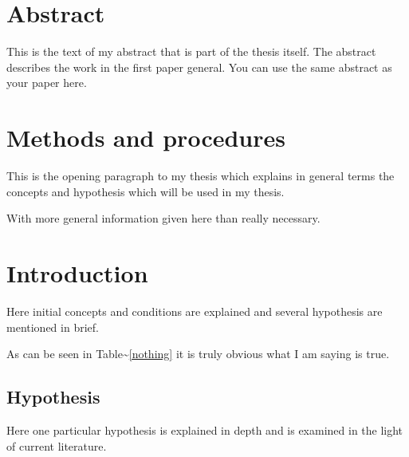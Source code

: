 \documentclass[
  12pt,
  notitlepage]{isuthesis}
\begin{document}
\section{Abstract}

This is the text of my abstract that is part of the thesis itself.
The abstract describes the work in the first paper general. You can use the same abstract as your paper here.

\section{Methods and procedures}

This is the opening paragraph to my thesis which
explains in general terms the concepts and hypothesis
which will be used in my thesis.

With more general information given here than really
necessary.

\section{Introduction}

Here initial concepts and conditions are explained and
several hypothesis are mentioned in brief.

As can be seen in Table\textasciitilde{}\ref{nothing} it is truly
obvious what I am saying is true.

\begin{table}[h!tb] \centering
{}
\label{nothing}

\vspace{ 2 in}
\end{table}

\subsection{Hypothesis}

Here one particular hypothesis is explained in depth
and is examined in the light of current literature.
\end{document}

